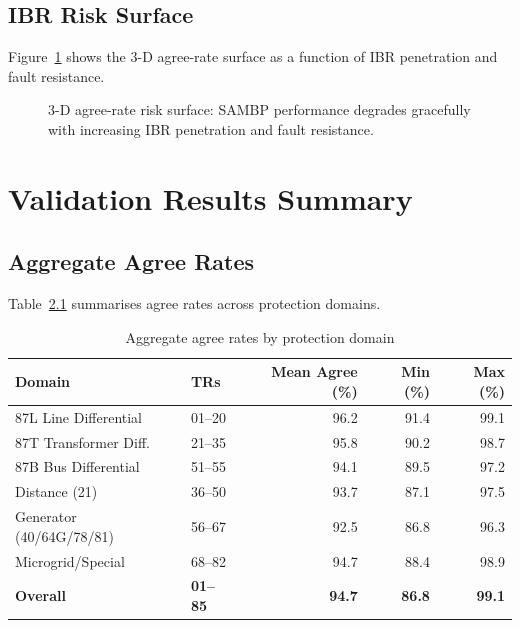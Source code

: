 \documentclass[11pt,a4paper]{report}
\begin{document}
\section{IBR Risk Surface}

Figure~\ref{fig:risk_surface} shows the 3-D agree-rate surface as a function of IBR penetration and fault resistance.

\begin{figure}[ht]
\centering
{}
\caption{3-D agree-rate risk surface: SAMBP performance degrades gracefully with increasing IBR penetration and fault resistance.}
\label{fig:risk_surface}
\end{figure}

\chapter{Validation Results Summary}
\label{ch:results}

\section{Aggregate Agree Rates}

Table~\ref{tab:agree_summary} summarises agree rates across protection domains.

\begin{table}[ht]
\centering
\caption{Aggregate agree rates by protection domain}
\label{tab:agree_summary}
\begin{tabular}{llrrr}
\toprule
Domain & TRs & Mean Agree (\%) & Min (\%) & Max (\%) \\
\midrule
87L Line Differential & 01--20 & 96.2 & 91.4 & 99.1 \\
87T Transformer Diff. & 21--35 & 95.8 & 90.2 & 98.7 \\
87B Bus Differential & 51--55 & 94.1 & 89.5 & 97.2 \\
Distance (21) & 36--50 & 93.7 & 87.1 & 97.5 \\
Generator (40/64G/78/81) & 56--67 & 92.5 & 86.8 & 96.3 \\
Microgrid/Special & 68--82 & 94.7 & 88.4 & 98.9 \\
\midrule
\textbf{Overall} & \textbf{01--85} & \textbf{94.7} & \textbf{86.8} & \textbf{99.1} \\
\bottomrule
\end{tabular}
\end{table}
\end{document}
